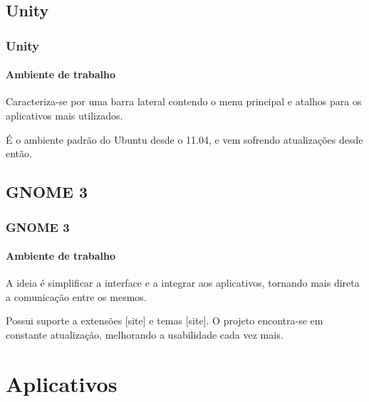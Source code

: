 \subsection{Unity}

\begin{frame}


\end{frame}

\begin{frame}\frametitle{Unity}\framesubtitle{Ambiente de trabalho}

Caracteriza-se por uma barra lateral contendo o menu principal e atalhos para os aplicativos
mais utilizados.

\medskip

É o ambiente padrão do Ubuntu desde o 11.04, e vem sofrendo atualizações desde então.

\end{frame}

\subsection{GNOME 3}

\begin{frame}


\end{frame}

\begin{frame}\frametitle{GNOME 3}\framesubtitle{Ambiente de trabalho}

A ideia é simplificar a interface e a integrar aos aplicativos, tornando mais direta
a comunicação entre os mesmos.

\medskip

Possui suporte a extensões [site] e temas [site]. O projeto encontra-se em constante
atualização, melhorando a usabilidade cada vez mais.

\end{frame}

\section{Aplicativos}

\begin{frame}


\end{frame}


